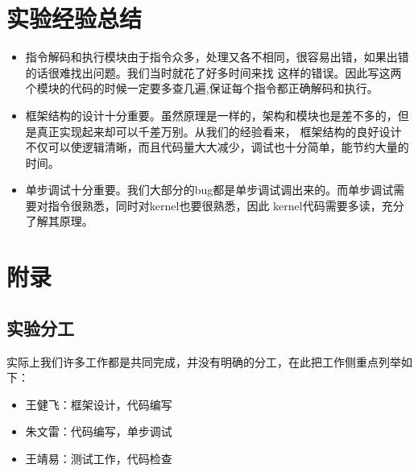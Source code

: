 \documentclass[10pt]{article}
\begin{document}
\begin{CJK}{UTF8}{gbsn}
\begin{itemize}
\end{itemize}

\section{实验经验总结}

\begin{itemize}
\item 指令解码和执行模块由于指令众多，处理又各不相同，很容易出错，如果出错的话很难找出问题。我们当时就花了好多时间来找
这样的错误。因此写这两个模块的代码的时候一定要多查几遍,保证每个指令都正确解码和执行。

\item 框架结构的设计十分重要。虽然原理是一样的，架构和模块也是差不多的，但是真正实现起来却可以千差万别。从我们的经验看来，
框架结构的良好设计不仅可以使逻辑清晰，而且代码量大大减少，调试也十分简单，能节约大量的时间。

\item 单步调试十分重要。我们大部分的bug都是单步调试调出来的。而单步调试需要对指令很熟悉，同时对kernel也要很熟悉，因此
kernel代码需要多读，充分了解其原理。

\end{itemize}

\newpage

\section{附录}
\subsection{实验分工}
实际上我们许多工作都是共同完成，并没有明确的分工，在此把工作侧重点列举如下：\\
\begin{itemize}
\item 王健飞：框架设计，代码编写
\item 朱文雷：代码编写，单步调试
\item 王靖易：测试工作，代码检查
\end{itemize}

\newpage


\end{CJK}
\end{document}
